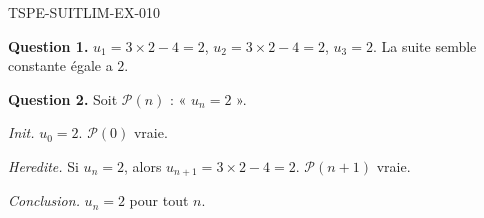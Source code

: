 \begin{corrige}{TSPE-SUITLIM-EX-010}

\textbf{Question 1.} $u_1 = 3 \times 2 - 4 = 2$, $u_2 = 3 \times 2 - 4 = 2$, $u_3 = 2$. La suite semble constante égale a $2$.


\textbf{Question 2.} Soit $\mathcal{P}(n)$ : « $u_n = 2$ ».

\textit{Init.} $u_0 = 2$. $\mathcal{P}(0)$ vraie.

\textit{Heredite.} Si $u_n = 2$, alors $u_{n+1} = 3 \times 2 - 4 = 2$. $\mathcal{P}(n+1)$ vraie.

\textit{Conclusion.} $\boxed{u_n = 2}$ pour tout $n$.

\end{corrige}
